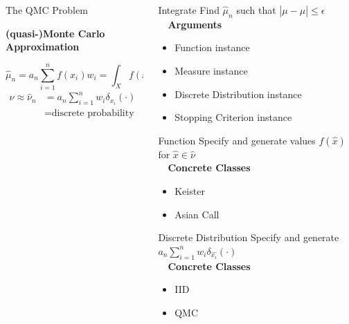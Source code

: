 \documentclass[final]{beamer}
\newcommand{\bfCenter}[1]{\centerline{\textbf{#1}}}
\newlength{\onecolwid}
\newlength{\threecolwid}
\newcommand{\dif}{\mathrm{d}}
\begin{document}
\begin{frame}[t]
\begin{columns}[t]
\begin{column}{\threecolwid}
\begin{columns}[t,totalwidth=\threecolwid]
\begin{column}{\onecolwid}
\begin{block}{The QMC Problem}
    \vspace{2ex}
    \bfCenter{(quasi-)Monte Carlo Approximation}
        \begin{equation*}
            \hat{\mu}_n = a_n \sum_{i=1}^{n} f(x_i)w_i =  \int_{X} f(x) \, \hat{\nu}( \dif x)
            \label{qmcApprox}
        \end{equation*}
        \begin{align*}
            \nu \approx \hat{\nu}_n & = a_n \sum_{i=1}^n w_i \delta_{\hat{x_i}}(\cdot) \\
            & = \text{discrete probability measure}
        \end{align*}
\end{block}
\end{column}


\begin{column}{\onecolwid}%
\begin{alertblock}{Integrate}
    Find $\hat{\mu}_n$ such that $\left | \mu - \hat{\mu} \right  | \leq \epsilon$ \\[1ex]~\
    \textbf{Arguments}
    \begin{itemize}
        \item Function instance
        \item Measure instance
        \item Discrete Distribution instance
        \item Stopping Criterion instance
    \end{itemize}
\end{alertblock}%

\begin{alertblock}{Function}
    Specify and generate values $f(\hat{x})$ for $\hat{x} \in \hat{\nu}$ \\[1ex]~\
    \textbf{Concrete Classes}
    \begin{itemize}
        \item Keister
        \item Asian Call
    \end{itemize}
\end{alertblock}%

\begin{alertblock}{Discrete Distribution}
    Specify and generate $a_n \sum_{i=1}^n w_i \delta_{\hat{x_i}}(\cdot)$ \\[1ex]~\
    \textbf{Concrete Classes}
    \begin{itemize}
        \item IID
        \item QMC
    \end{itemize}
\end{alertblock}
\end{column} 


\end{columns}
\end{column}
\end{columns}
\end{frame}
\end{document}
